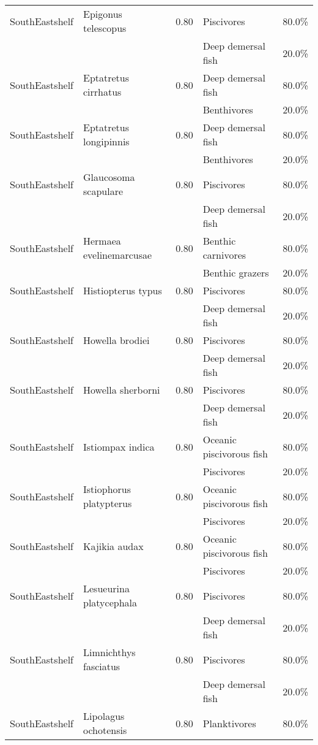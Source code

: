 \begin{longtable}{llcll}
\hline
SouthEastshelf & Epigonus telescopus & 0.80 & Piscivores & 80.0\% \\
& & & Deep demersal fish & 20.0\% \\
\hline
SouthEastshelf & Eptatretus cirrhatus & 0.80 & Deep demersal fish & 80.0\% \\
& & & Benthivores & 20.0\% \\
\hline
SouthEastshelf & Eptatretus longipinnis & 0.80 & Deep demersal fish & 80.0\% \\
& & & Benthivores & 20.0\% \\
\hline
SouthEastshelf & Glaucosoma scapulare & 0.80 & Piscivores & 80.0\% \\
& & & Deep demersal fish & 20.0\% \\
\hline
SouthEastshelf & Hermaea evelinemarcusae & 0.80 & Benthic carnivores & 80.0\% \\
& & & Benthic grazers & 20.0\% \\
\hline
SouthEastshelf & Histiopterus typus & 0.80 & Piscivores & 80.0\% \\
& & & Deep demersal fish & 20.0\% \\
\hline
SouthEastshelf & Howella brodiei & 0.80 & Piscivores & 80.0\% \\
& & & Deep demersal fish & 20.0\% \\
\hline
SouthEastshelf & Howella sherborni & 0.80 & Piscivores & 80.0\% \\
& & & Deep demersal fish & 20.0\% \\
\hline
SouthEastshelf & Istiompax indica & 0.80 & Oceanic piscivorous fish & 80.0\% \\
& & & Piscivores & 20.0\% \\
\hline
SouthEastshelf & Istiophorus platypterus & 0.80 & Oceanic piscivorous fish & 80.0\% \\
& & & Piscivores & 20.0\% \\
\hline
SouthEastshelf & Kajikia audax & 0.80 & Oceanic piscivorous fish & 80.0\% \\
& & & Piscivores & 20.0\% \\
\hline
SouthEastshelf & Lesueurina platycephala & 0.80 & Piscivores & 80.0\% \\
& & & Deep demersal fish & 20.0\% \\
\hline
SouthEastshelf & Limnichthys fasciatus & 0.80 & Piscivores & 80.0\% \\
& & & Deep demersal fish & 20.0\% \\
\hline
SouthEastshelf & Lipolagus ochotensis & 0.80 & Planktivores & 80.0\% \\

\end{longtable}
